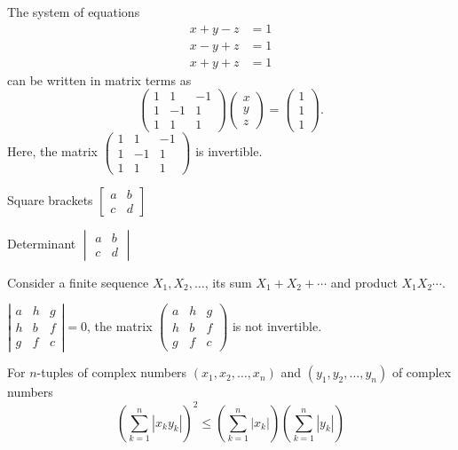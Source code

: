 \documentclass{article}
\begin{document}
The system of equations
\begin{align*}
x+y-z & = 1\\
x-y+z & = 1\\
x+y+z & = 1
\end{align*}
can be written in matrix terms as
\begin{equation*}
\begin{pmatrix}
1 & 1 & -1\\
1 & -1 & 1\\
1 & 1 & 1
\end{pmatrix}
\begin{pmatrix}
x\\
y\\
z
\end{pmatrix}
=
\begin{pmatrix}
1\\
1\\
1
\end{pmatrix}.
\end{equation*}
Here, the matrix
$\begin{pmatrix}
1 & 1 & -1\\
1 & -1 & 1\\
1 & 1 & 1
\end{pmatrix}$
is invertible.

Square brackets
$
\begin{bmatrix}
a & b\\
c & d
\end{bmatrix}
$

Determinant
$
\begin{vmatrix}
a & b\\
c & d
\end{vmatrix}
$

Consider a finite sequence $X_1,X_2,\dotsc$, its sum $X_1+X_2+\dotsb$
and product $X_1X_2\dotsm$.

$
\left|\begin{smallmatrix}
a & h & g\\
h & b & f\\
g & f & c
\end{smallmatrix}\right|
=0
$,
the matrix
$
\left(\begin{smallmatrix}
a & h & g\\
h & b & f\\
g & f & c
\end{smallmatrix}\right)
$
is not invertible.

For $n$-tuples of complex numbers $(x_1,x_2,\dotsc,x_n)$ and
$(y_1,y_2,\dotsc,y_n)$ of complex numbers
\begin{equation*}
\left(\sum_{k=1}^n|x_ky_k|\right)^2\le
\left(\sum_{k=1}^{n}|x_k|\right)\left(\sum_{k=1}^{n}|y_k|\right)
\end{equation*}
\end{document}

